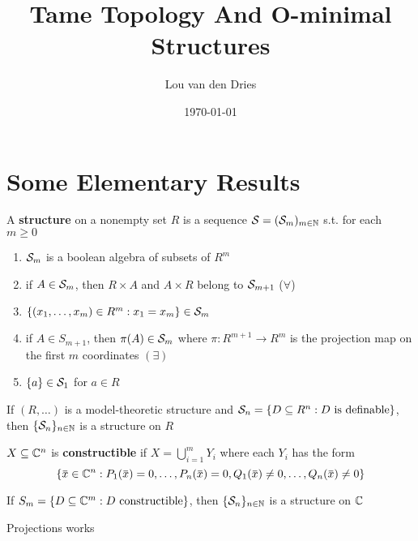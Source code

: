 \documentclass[11pt]{article}
\author{Lou van den Dries}
\date{\today}
\title{Tame Topology And O-minimal Structures}
\begin{document}
\maketitle
\tableofcontents


\section{Some Elementary Results}
\label{sec:org256a2f2}
\begin{definition}[]
A \textbf{structure} on a nonempty set \(R\) is a sequence \(\mathcal{S}=(\mathcal{S}_m)_{m\in\mathbb{N}}\) s.t. for each \(m\ge 0\)
\begin{enumerate}
\item \(\mathcal{S}_m\) is a boolean algebra of subsets of \(R^m\)
\item if \(A\in\mathcal{S}_m\), then \(R\times A\) and \(A\times R\) belong to \(\mathcal{S}_{m+1}\) (\(\forall\))
\item \(\{(x_1,\dots,x_m)\in R^m:x_1=x_m\}\in\mathcal{S}_m\)
\item if \(A\in S_{m+1}\), then \(\pi(A)\in\mathcal{S}_m\) where \(\pi:R^{m+1}\to R^m\) is the projection map on the
first \(m\) coordinates \((\exists)\)
\item \(\{a\}\in\mathcal{S}_1\) for \(a\in R\)
\end{enumerate}
\end{definition}

\begin{fact}[]
If \((R,\dots)\) is a model-theoretic structure and \(\mathcal{S}_n=\{D\subseteq R^n:D\text{ is definable}\}\),
then \(\{\mathcal{S}_n\}_{n\in\mathbb{N}}\) is a structure on \(R\)
\end{fact}

\begin{definition}[]
\(X\subseteq\mathbb{C}^n\) is \textbf{constructible} if \(X=\bigcup_{i=1}^mY_i\) where each \(Y_i\) has the form
\begin{equation*}
\{\barx\in\C^n:P_1(\barx)=0,\dots,P_n(\barx)=0, Q_1(\barx)\neq 0,\dots,Q_n(\barx)\neq 0\}
\end{equation*}
\end{definition}

\begin{fact}[]
If \(S_m=\{D\subseteq\mathbb{C}^m:D\text{ constructible}\}\), then \(\{\mathcal{S}_n\}_{n\in\mathbb{N}}\) is a structure on \(\mathbb{C}\)
\end{fact}

\begin{theorem}
Projections works
\end{theorem}
\end{document}
